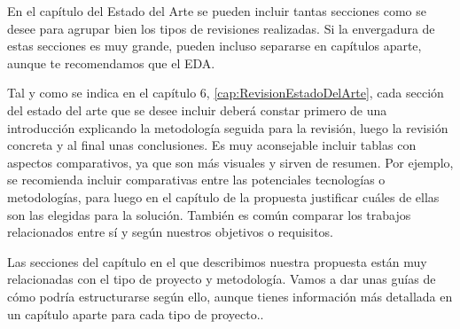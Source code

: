 En el capítulo del Estado del Arte se pueden incluir tantas secciones como se desee para agrupar bien los tipos de revisiones realizadas. Si la envergadura de estas secciones es muy grande, pueden incluso separarse en capítulos aparte, aunque te recomendamos que el EDA.

Tal y como se indica en el capítulo 6, \ref{cap:RevisionEstadoDelArte}, cada sección del estado del arte que se desee incluir deberá constar primero de una introducción explicando la metodología seguida para la revisión, luego la revisión concreta y al final unas conclusiones. Es muy aconsejable incluir tablas con aspectos comparativos, ya que son más visuales y sirven de resumen. Por ejemplo, se recomienda incluir comparativas entre las potenciales tecnologías o metodologías, para luego en el capítulo de la propuesta justificar cuáles de ellas son las elegidas para la solución. También es común comparar los trabajos relacionados entre sí y según nuestros objetivos o requisitos.

Las secciones del capítulo en el que describimos nuestra propuesta están muy relacionadas con el tipo de proyecto y metodología. Vamos a dar unas guías de cómo podría estructurarse según ello, aunque tienes información más detallada en un capítulo aparte para cada tipo de proyecto..

